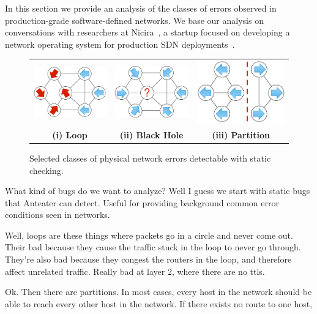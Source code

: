 
In this section we provide an analysis of the classes of errors observed in
production-grade software-defined networks. We base our analysis on conversations with
researchers at Nicira~\cite{nicira}, a startup focused on developing a network operating
system for production SDN deployments~\cite{onix}.

\begin{figure}[t]
    \centering
    \begin{tabular}{ccc}
    \hspace{-5pt}\includegraphics[width=.9in]{../diagrams/bugs/loop.pdf}&
    \includegraphics[width=.9in]{../diagrams/bugs/dead_end.pdf}&
    \includegraphics[width=.9in]{../diagrams/bugs/partition.pdf}\\
    {\bf (i) Loop}&{\bf (ii) Black Hole}&{\bf (iii) Partition}\\
    \end{tabular}
    \caption[]{\label{fig:invariantviolations} Selected classes of physical network errors detectable with static
    checking.\vspace{-10pt}} 
\end{figure}


What kind of bugs do we want to analyze? Well I guess we start with static
bugs that Anteater can detect. Useful for providing background common error
conditions seen in networks. 

Well, loops are these things where packets go in a circle and never come out.
Their bad because they cause the traffic stuck in the loop to never go
through. They're also bad because they congest the routers in the loop, and
therefore affect unrelated traffic. Really bad at layer 2, where there are no
ttls.

Ok. Then there are partitions. In most cases, every host in the network should
be able to reach every other host in the network. If there exists no route to
one host, 

